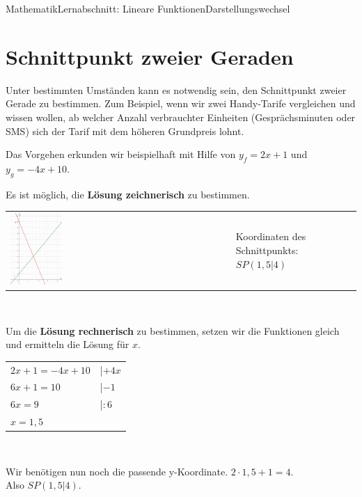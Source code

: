 \documentclass[11pt,twocolumn,oneside,openany,headings=optiontotoc,11pt,numbers=noenddot]{article}
\begin{document}
\begin{worksheet}{Mathematik}{Lernabschnitt: Lineare Funktionen}{Darstellungswechsel}
		\section{Schnittpunkt zweier Geraden}
		Unter bestimmten Umständen kann es notwendig sein, den Schnittpunkt zweier Gerade zu bestimmen. Zum Beispiel, wenn wir zwei Handy-Tarife vergleichen und wissen wollen, ab welcher Anzahl verbrauchter Einheiten (Gesprächsminuten oder SMS) sich der Tarif mit dem höheren Grundpreis lohnt.\\
		\par\noindent
		Das Vorgehen erkunden wir beispielhaft mit Hilfe von \(y_f=2x+1\) und \(y_g = -4x+10\).\\
		\par\noindent
		Es ist möglich, die \textbf{Lösung zeichnerisch} zu bestimmen.\\
		\begin{tabularx}{0.5\textwidth}{XX}
			\includegraphics[width=0.24\textwidth,align=t]{../99_Bilder/SzG.png} & \begin{framed}
				Koordinaten des Schnittpunkts: \(SP(1,5|4)\)
			\end{framed}
		\end{tabularx}\\
		\par\noindent
		Um die \textbf{Lösung rechnerisch} zu bestimmen, setzen wir die Funktionen gleich und ermitteln die Lösung für \(x\).\\
		\par\noindent
		\begin{tabularx}{0.48\textwidth}{ll}
			\(2x+1 = -4x+10\) & |\(+4x\)\\
			\(6x + 1 = 10\) & |\(-1\)\\
			\(6x = 9\) & |\(:6\)\\
			\(x = 1,5\)
		\end{tabularx}\\
		\par\noindent
		Wir benötigen nun noch die passende y-Koordinate. \(2\cdot{}1,5 + 1 = 4\).\\
		Also \(SP(1,5|4)\).
		\newpage

\end{worksheet}
\end{document}
